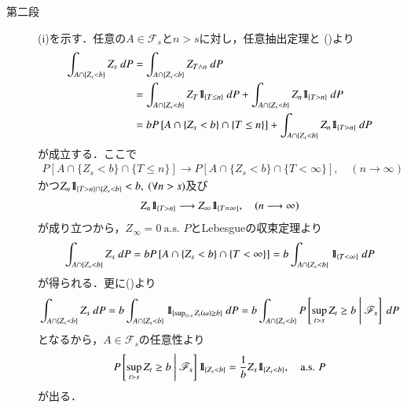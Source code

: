 \begin{prf}
\begin{description}
			\item[第二段]
				(i)を示す．任意の$A \in \mathscr{F}_s$と$n > s$に対し，任意抽出定理と
				()より
				\begin{align}
					\int_{A \cap \{Z_s < b\}} Z_s\ dP
					&= \int_{A \cap \{Z_s < b\}} Z_{T \wedge n}\ dP \\
					&= \int_{A \cap \{Z_s < b\}} Z_T \defunc_{\{T \leq n\}}\ dP
						+ \int_{A \cap \{Z_s < b\}} Z_n \defunc_{\{T > n\}}\ dP \\
					&= b P\left[ A \cap \{Z_s < b\} \cap \{T \leq n\} \right]
						+ \int_{A \cap \{Z_s < b\}} Z_n \defunc_{\{T > n\}}\ dP
				\end{align}
				が成立する．ここで
				\begin{align}
					P\left[ A \cap \{Z_s < b\} \cap \{T \leq n\} \right]
					\longrightarrow 
					P\left[ A \cap \{Z_s < b\} \cap \{T < \infty\} \right],
					\quad (n \longrightarrow \infty)
				\end{align}
				かつ$Z_n \mbox{1}\hspace{-0.25em}\mbox{l}_{\{T > n\} \cap \{Z_s < b\}} < b,\ (\forall n > s)$及び
				\begin{align}
					Z_n \mbox{1}\hspace{-0.25em}\mbox{l}_{\{T > n\}} \longrightarrow Z_\infty \mbox{1}\hspace{-0.25em}\mbox{l}_{\{T=\infty\}},
					\quad (n \longrightarrow \infty)
				\end{align}
				が成り立つから，$Z_\infty = 0\ \mbox{a.s. $P$}$とLebesgueの収束定理より
				\begin{align}
					\int_{A \cap \{Z_s < b\}} Z_s\ dP
					= b P\left[ A \cap \{Z_s < b\} \cap \{T < \infty\} \right]
					= b \int_{A \cap \{Z_s < b\}} \mbox{1}\hspace{-0.25em}\mbox{l}_{\{T < \infty\}}\ dP
				\end{align}
				が得られる．更に()より
				\begin{align}
					\int_{A \cap \{Z_s < b\}} Z_s\ dP
					= b \int_{A \cap \{Z_s < b\}} \mbox{1}\hspace{-0.25em}\mbox{l}_{\{\operatorname*{sup}_{t > s} Z_t(\omega) \geq b\}}\ dP
					= b \int_{A \cap \{Z_s < b\}} P\left[ \operatorname*{sup}_{t>s} Z_t \geq b\ \middle|\ \mathscr{F}_s \right]\ dP
				\end{align}
				となるから，$A \in \mathscr{F}_s$の任意性より
				\begin{align}
					P\left[ \sup{t>s}{Z_t \geq b}\ \middle|\ \mathscr{F}_s \right] \defunc_{\{Z_s < b\}}
					= \frac{1}{b} Z_s \defunc_{\{Z_s < b\}},
					\quad \mbox{a.s. $P$}
				\end{align}
				が出る．
				

\end{description}
\end{prf}
